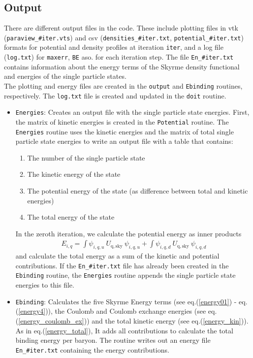 \documentclass[3p]{elsarticle}
\begin{document}
\subsection{Output}
There are different output files in the code. These include plotting files in vtk (\texttt{paraview\_\#iter.vts}) and csv (\texttt{densities\_\#iter.txt}, \texttt{potential\_\#iter.txt}) formats for potential and density profiles at iteration \texttt{iter}, and a log file (\texttt{log.txt}) for \texttt{maxerr}, \texttt{BE} aso. for each iteration step. The  file \texttt{En\_\#iter.txt} contains information about the energy terms of the Skyrme density functional and energies of the single particle states. \\
The plotting and energy files are created in the \texttt{output} and \texttt{Ebinding} routines, respectively. The \texttt{log.txt} file is created and updated in the \texttt{doit} routine.
\begin{itemize}
\item \texttt{Energies}: Creates an output file with the single particle state energies. First, the matrix of kinetic energies is created in the \texttt{Potential} routine. The \texttt{Energies} routine uses the kinetic energies and the matrix of total single particle state energies to write an output file with a table that contains:
\begin{enumerate}
\item The number of the single particle state
\item The kinetic energy of the state
\item The potential energy of the state (as difference between total and kinetic energies)
\item The total energy of the state
\end{enumerate}
In the zeroth iteration, we calculate the potential energy as inner products 
\begin{align}
E_{i,q} = \int \psi_{i,q,u} \: U_\mathrm{q,sky} \:  \psi_{i, q, u} + \int \psi_{i, q, d} \: U_\mathrm{q,sky} \: \psi_{i,q,d}
\end{align}
and calculate the total energy as a sum of the kinetic and potential contributions. If the \texttt{En\_\#iter.txt} file has already been created in the \texttt{Ebinding} routine, the \texttt{Energies} routine appends the single particle state energies to this file.
\item \texttt{Ebinding}: Calculates the five Skyrme Energy terms (see eq.(\ref{energy01}) - eq.(\ref{energy4})), the Coulomb and Coulomb exchange energies (see eq.(\ref{energy_coulomb_ex})) and the total kinetic energy (see eq.(\ref{energy_kin})). As in eq.(\ref{energy_total}), It adds all contributions to calculate the total binding energy per baryon. The routine writes out an energy file \texttt{En\_\#iter.txt} containing the energy contributions. 
\end{itemize}
\end{document}
